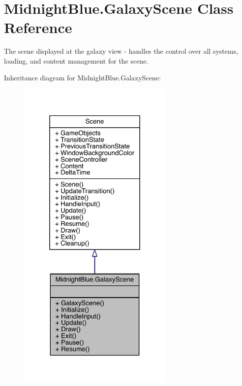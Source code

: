 \hypertarget{class_midnight_blue_1_1_galaxy_scene}{}\section{Midnight\+Blue.\+Galaxy\+Scene Class Reference}
\label{class_midnight_blue_1_1_galaxy_scene}


The scene displayed at the galaxy view -\/ handles the control over all systems, loading, and content management for the scene.  




Inheritance diagram for Midnight\+Blue.\+Galaxy\+Scene\+:\nopagebreak
\begin{figure}[H]
\begin{center}
\leavevmode
\includegraphics[width=217pt]{class_midnight_blue_1_1_galaxy_scene__inherit__graph}
\end{center}
\end{figure}


